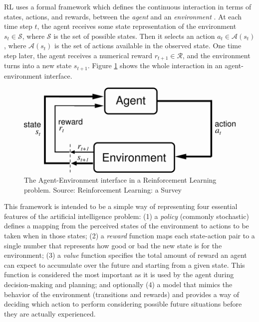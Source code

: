 RL uses a formal framework which defines the continuous interaction in terms of states, actions, and rewards, between the \textit{agent} and an \textit{environment} \cite{sutton1998reinforcement}. At each time step $t$, the agent receives some state representation of the environment $s_t \in \mathcal{S}$, where $\mathcal{S}$ is the set of possible states. Then it selects an action $a_t \in \mathcal{A}(s_t)$ , where $\mathcal{A}(s_t)$ is the set of actions available in the observed state. One time step later, the agent receives a numerical reward $r_{t+1} \in \mathcal{R}$, and the environment turns into a new state $s_{t+1}$. Figure \ref{fig:rlenvironment} shows the whole interaction in an agent-environment interface.

 \begin{figure}[t]
\centering
\includegraphics[scale=2]{images/rlenvironment}
\caption[Agent-Environment interface in a Reinforcement Learning problem]{The Agent-Environment interface in a Reinforcement Learning problem. Source: Reinforcement Learning: a Survey \cite{sutton1998reinforcement} }
\label{fig:rlenvironment}
\end{figure}

This framework is intended to be a simple way of representing four essential features of the artificial intelligence problem: (1) a \textit{policy} (commonly stochastic) defines a mapping from the perceived states of the environment to actions to be taken when in those states; (2) a \textit{reward} function maps each state-action pair to a single number that represents how good or bad the new state is for the environment; (3) a \textit{value} function specifies the total amount of reward an agent can expect to accumulate over the future and starting from a given state. This function is considered the most important as it is used by the agent during decision-making and planning; and optionally (4) a model that mimics the behavior of the environment (transitions and rewards) and provides a way of deciding which action to perform considering possible future situations before they are actually experienced.

